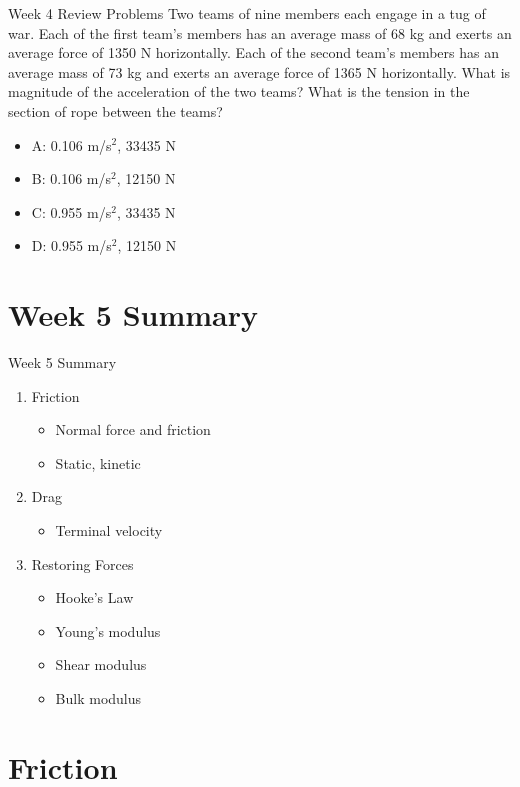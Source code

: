 \documentclass{beamer}
\begin{document}
\begin{frame}{Week 4 Review Problems}
Two teams of nine members each engage in a tug of war.  Each of the first team’s members has an average mass of 68 kg and exerts an average force of 1350 N horizontally. Each of the second team’s members has an average mass of 73 kg and exerts an average force of 1365 N horizontally.  What is magnitude of the acceleration of the two teams?  What is the tension in the section of rope between the teams?
\begin{itemize}
\item A: 0.106 m/s$^2$, 33435 N
\item B: 0.106 m/s$^2$, 12150 N
\item C: 0.955 m/s$^2$, 33435 N
\item D: 0.955 m/s$^2$, 12150 N
\end{itemize}
\end{frame}

\section{Week 5 Summary}

\begin{frame}{Week 5 Summary}
\begin{enumerate}
\item \alert{Friction}
\begin{itemize}
\item Normal force and friction
\item Static, kinetic
\end{itemize}
\item \alert{Drag}
\begin{itemize}
\item Terminal velocity
\end{itemize}
\item \alert{Restoring Forces}
\begin{itemize}
\item Hooke's Law
\item Young's modulus
\item Shear modulus
\item Bulk modulus
\end{itemize}
\end{enumerate}
\end{frame}

\section{Friction}
\end{document}
